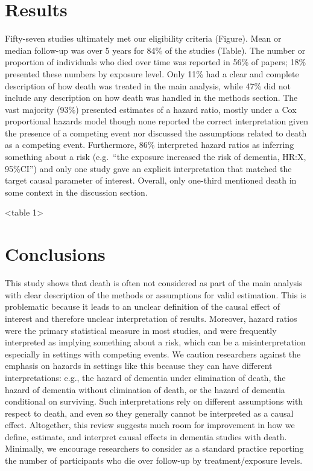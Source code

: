 \documentclass[
]{book}
\begin{document}
\hypertarget{results-3}{%
\section{Results}\label{results-3}}

Fifty-seven studies ultimately met our eligibility criteria (Figure). Mean or median follow-up was over 5 years for 84\% of the studies (Table). The number or proportion of individuals who died over time was reported in 56\% of papers; 18\% presented these numbers by exposure level. Only 11\% had a clear and complete description of how death was treated in the main analysis, while 47\% did not include any description on how death was handled in the methods section. The vast majority (93\%) presented estimates of a hazard ratio, mostly under a Cox proportional hazards model though none reported the correct interpretation given the presence of a competing event nor discussed the assumptions related to death as a competing event\autocite{young2020,geskus2016,andersen2012}. Furthermore, 86\% interpreted hazard ratios as inferring something about a risk (e.g.~``the exposure increased the risk of dementia, HR:X, 95\%CI'') and only one study gave an explicit interpretation that matched the target causal parameter of interest. Overall, only one-third mentioned death in some context in the discussion section.

\textless table 1\textgreater{}

\hypertarget{conclusions}{%
\section{Conclusions}\label{conclusions}}

This study shows that death is often not considered as part of the main analysis with clear description of the methods or assumptions for valid estimation. This is problematic because it leads to an unclear definition of the causal effect of interest and therefore unclear interpretation of results. Moreover, hazard ratios were the primary statistical measure in most studies, and were frequently interpreted as implying something about a risk, which can be a misinterpretation especially in settings with competing events\autocite{geskus2016}. We caution researchers against the emphasis on hazards in settings like this because they can have different interpretations: e.g., the hazard of dementia under elimination of death, the hazard of dementia without elimination of death, or the hazard of dementia conditional on surviving\autocite{young2020,geskus2016}. Such interpretations rely on different assumptions with respect to death, and even so they generally cannot be interpreted as a causal effect\autocite{young2020,hernan2010,stensrud2020,geskus2016}. Altogether, this review suggests much room for improvement in how we define, estimate, and interpret causal effects in dementia studies with death. Minimally, we encourage researchers to consider as a standard practice reporting the number of participants who die over follow-up by treatment/exposure levels.
\end{document}
